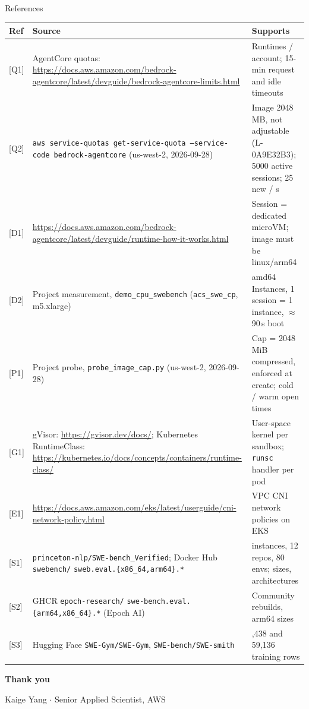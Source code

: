 \begin{frame}{References}
\scriptsize
\begin{tabularx}{\textwidth}{@{}l>{\raggedright\arraybackslash}X>{\raggedright\arraybackslash}p{4.2cm}@{}}
\toprule
\textbf{Ref} & \textbf{Source} & \textbf{Supports}\\
\midrule
{[Q1]} & AgentCore quotas: \url{https://docs.aws.amazon.com/bedrock-agentcore/latest/devguide/bedrock-agentcore-limits.html} & 1000 Runtimes / account; 15-min request and idle timeouts\\
{[Q2]} & \texttt{aws service-quotas get-service-quota --service-code bedrock-agentcore} (us-west-2, 2026-09-28) & Image 2048\,MB, not adjustable (L-0A9E32B3); 5000 active sessions; 25 new / s\\
{[D1]} & \url{https://docs.aws.amazon.com/bedrock-agentcore/latest/devguide/runtime-how-it-works.html} & Session = dedicated microVM; image must be linux/arm64\\
{[D2]} & Project measurement, \texttt{demo\_cpu\_swebench} (\texttt{acs\_swe\_cp}, m5.xlarge) & amd64 Instances, 1 session = 1 instance, $\approx$\,90\,s boot\\
{[P1]} & Project probe, \texttt{probe\_image\_cap.py} (us-west-2, 2026-09-28) & Cap = 2048\,MiB compressed, enforced at create; cold / warm open times\\
{[G1]} & gVisor: \url{https://gvisor.dev/docs/}; Kubernetes RuntimeClass: \url{https://kubernetes.io/docs/concepts/containers/runtime-class/} & User-space kernel per sandbox; \texttt{runsc} handler per pod\\
{[E1]} & \url{https://docs.aws.amazon.com/eks/latest/userguide/cni-network-policy.html} & VPC CNI network policies on EKS\\
{[S1]} & \texttt{princeton-nlp/SWE-bench\_Verified}; Docker Hub \texttt{swebench/} \texttt{sweb.eval.\{x86\_64,arm64\}.*} & 500 instances, 12 repos, 80 envs; sizes, architectures\\
{[S2]} & GHCR \texttt{epoch-research/} \texttt{swe-bench.eval.\{arm64,x86\_64\}.*} (Epoch AI) & Community rebuilds, arm64 sizes\\
{[S3]} & Hugging Face \texttt{SWE-Gym/SWE-Gym}, \texttt{SWE-bench/SWE-smith} & 2,438 and 59,136 training rows\\
\bottomrule
\end{tabularx}
\end{frame}

{
\begin{frame}[plain]
\vspace*{10mm}
{\fontsize{28}{32}\selectfont\bfseries\color{white}Thank you\par}
\vspace{4mm}
{\small\color{white}Kaige Yang $\cdot$ Senior Applied Scientist, AWS\par}
\end{frame}}


